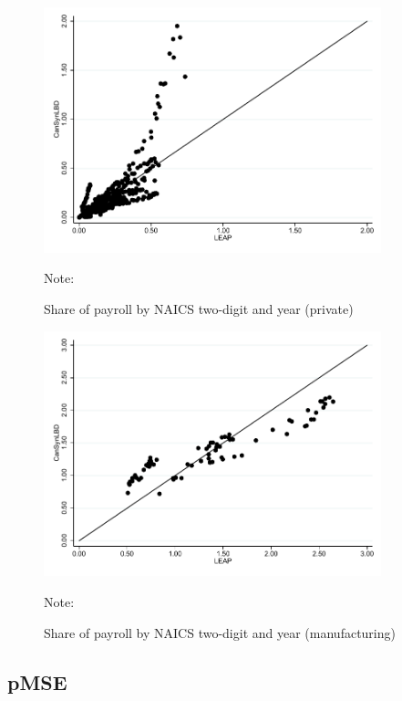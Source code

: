 \begin{figure} [H]
\centering
\caption{Share of payroll by NAICS two-digit and year (private)} \label{PayrollSharePrivate}
\includegraphics[height=2.8in, width=.7\linewidth]{graphs/Share_of_payroll_by_NAICS_two-digit_and_year_private_bw.pdf} 
\begin{minipage}{0.85\textwidth}
{\footnotesize Note: \CanTableNote \par}
\end{minipage}
\end{figure}
\vspace{-15.5pt}
\begin{figure} [H]
\centering
\caption{Share of payroll by NAICS two-digit and year (manufacturing)} \label{PayrollShareManufacturing}
\includegraphics[height=2.8in, width=.7\linewidth]{graphs/Share_of_payroll_by_NAICS_two-digit_and_year_Manufacturing_bw.pdf} 
\begin{minipage}{0.85\textwidth}
{\footnotesize Note: \CanTableNote \par}
\end{minipage}
\end{figure}

\subsection{pMSE}


